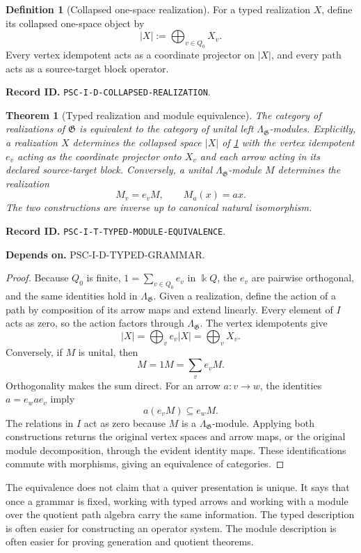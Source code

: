 \documentclass[11pt]{article}
\newtheorem{theorem}{Theorem}[section]
\theoremstyle{definition}
\newtheorem{definition}[definition]{Definition}
\theoremstyle{remark}
\newcommand{\bbk}{\Bbbk}
\newcommand{\RecordID}[1]{\par\smallskip\noindent\begingroup\footnotesize\color{PSCGray}\raggedright\textbf{Record ID.} \nolinkurl{#1}.\par\endgroup}
\newcommand{\Depends}[1]{\par\noindent\begingroup\footnotesize\color{PSCGray}\raggedright\textbf{Depends on.} #1\par\endgroup}
\begin{document}
\begin{definition}[Collapsed one-space realization]
\label{def:collapsed-realization}
For a typed realization $X$, define its collapsed one-space object by
\[
|X|:=\bigoplus_{v\in Q_0}X_v.
\]
Every vertex idempotent acts as a coordinate projector on $|X|$, and every path acts as a source-target block operator.
\end{definition}
\RecordID{PSC-I-D-COLLAPSED-REALIZATION}

\begin{theorem}[Typed realization and module equivalence]
\label{thm:typed-module-equivalence}
The category of realizations of $\mathfrak G$ is equivalent to the category of unital left $\Lambda_{\mathfrak G}$-modules.  Explicitly, a realization $X$ determines the collapsed space $|X|$ of \cref{def:collapsed-realization}
with the vertex idempotent $e_v$ acting as the coordinate projector onto $X_v$ and each arrow acting in its declared source-target block.  Conversely, a unital $\Lambda_{\mathfrak G}$-module $M$ determines the realization
\[
M_v=e_vM,
\qquad
M_a(x)=ax.
\]
The two constructions are inverse up to canonical natural isomorphism.
\end{theorem}
\RecordID{PSC-I-T-TYPED-MODULE-EQUIVALENCE}
\Depends{PSC-I-D-TYPED-GRAMMAR.}

\begin{proof}
Because $Q_0$ is finite, $1=\sum_{v\in Q_0}e_v$ in $\bbk Q$, the $e_v$ are pairwise orthogonal, and the same identities hold in $\Lambda_{\mathfrak G}$.  Given a realization, define the action of a path by composition of its arrow maps and extend linearly.  Every element of $I$ acts as zero, so the action factors through $\Lambda_{\mathfrak G}$.  The vertex idempotents give
\[
|X|=\bigoplus_v e_v|X|=\bigoplus_vX_v.
\]
Conversely, if $M$ is unital, then
\[
M=1M=\sum_ve_vM.
\]
Orthogonality makes the sum direct.  For an arrow $a:v\to w$, the identities $a=e_wae_v$ imply
\[
a(e_vM)\subseteq e_wM.
\]
The relations in $I$ act as zero because $M$ is a $\Lambda_{\mathfrak G}$-module.  Applying both constructions returns the original vertex spaces and arrow maps, or the original module decomposition, through the evident identity maps.  These identifications commute with morphisms, giving an equivalence of categories.
\end{proof}

\begin{interpretation}
The equivalence does not claim that a quiver presentation is unique.  It says that once a grammar is fixed, working with typed arrows and working with a module over the quotient path algebra carry the same information.  The typed description is often easier for constructing an operator system.  The module description is often easier for proving generation and quotient theorems.
\end{interpretation}
\end{document}
